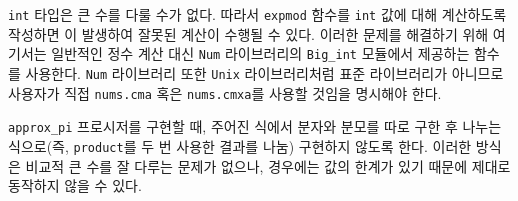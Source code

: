 
 \texttt{int} 타입은 큰 수를 다룰 수가 없다. 따라서 \texttt{expmod}
함수를 \texttt{int} 값에 대해 계산하도록 작성하면 이
발생하여 잘못된 계산이 수행될 수 있다. 이러한 문제를 해결하기 위해 여기서는
일반적인 정수 계산 대신 \texttt{Num} 라이브러리의 \texttt{Big\_int} 모듈에서
제공하는 함수를 사용한다. \texttt{Num} 라이브러리 또한 \texttt{Unix}
라이브러리처럼 표준 라이브러리가 아니므로 사용자가 직접 \texttt{nums.cma} 혹은
\texttt{nums.cmxa}를 사용할 것임을 명시해야 한다.







\texttt{approx\_pi} 프로시저를 구현할 때, 주어진 식에서 분자와 분모를 따로
구한 후 나누는 식으로(즉, \texttt{product}를 두 번 사용한 결과를 나눔) 구현하지
않도록 한다. 이러한 방식은 비교적 큰 수를 잘 다루는  문제가 없으나,
 경우에는 값의 한계가 있기 때문에 제대로 동작하지 않을 수 있다.

